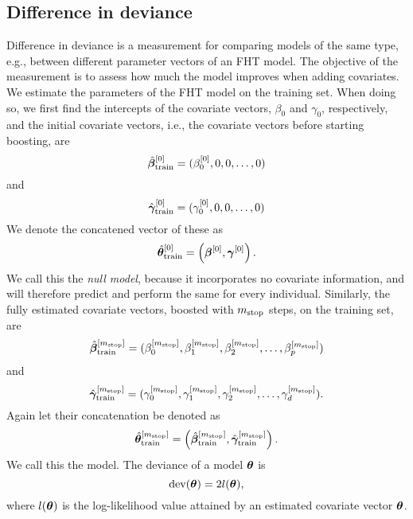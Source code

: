 \subsection{Difference in deviance}
Difference in deviance is a measurement for comparing models of the same type, e.g., between different parameter vectors of an FHT model.
The objective of the measurement is to assess how much the model improves when adding covariates.
We estimate the parameters of the FHT model on the training set.
When doing so, we first find the intercepts of the covariate vectors, $\beta_0$ and $\gamma_0$, respectively,
and the initial covariate vectors, i.e., the covariate vectors before starting boosting, are
\begin{equation*}
    \hat{\boldsymbol{\beta}}^{[0]}_{\text{train}}=(\beta_0^{[0]},0,0,\ldots,0)
\end{equation*}
and
\begin{equation*}
    \hat{\boldsymbol{\gamma}}^{[0]}_{\text{train}}=(\gamma_0^{[0]},0,0,\ldots,0)
\end{equation*}
We denote the concatened vector of these as
\begin{equation*}
    \hat{\boldsymbol{\theta}}^{[0]}_{\text{train}}=\left(\boldsymbol{\beta}^{[0]},\boldsymbol{\gamma}^{[0]}\right).
\end{equation*}
We call this the \textit{null model}, because it incorporates no covariate information, and will therefore predict and perform the same for every individual.
Similarly, the fully estimated covariate vectors, boosted with $m_{\text{stop}}$ steps, on the training set, are
\begin{equation*}
    \hat{\boldsymbol{\beta}}^{[m_{\text{stop}}]}_{\text{train}}=(\beta_0^{[m_{\text{stop}}]},\beta_1^{[m_{\text{stop}}]},\beta_2^{[m_{\text{stop}}]},\ldots,\beta_p^{[m_{\text{stop}}]})
\end{equation*}
and
\begin{equation*}
    \hat{\boldsymbol{\gamma}}^{[m_{\text{stop}}]}_{\text{train}}=(\gamma_0^{[m_{\text{stop}}]},\gamma_1^{[m_{\text{stop}}]},\gamma_2^{[m_{\text{stop}}]},\ldots,\gamma_d^{[m_{\text{stop}}]}).
\end{equation*}
Again let their concatenation be denoted as
\begin{equation*}
    \hat{\boldsymbol{\theta}}^{[m_{\text{stop}}]}_{\text{train}}=\left(\hat{\boldsymbol{\beta}}^{[m_{\text{stop}}]}_{\text{train}},\hat{\boldsymbol{\gamma}}^{[m_{\text{stop}}]}_{\text{train}}\right).
\end{equation*}
We call this the model.
The deviance of a model $\boldsymbol{\theta}$ is
\begin{equation}
    \text{dev}(\boldsymbol{\theta})=2l(\boldsymbol{\theta}),
\end{equation}
where $l(\boldsymbol{\theta})$ is the log-likelihood value attained by an estimated covariate vector $\boldsymbol{\theta}$.
